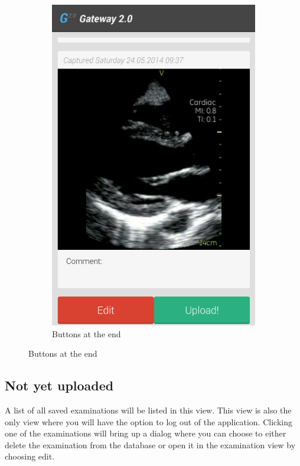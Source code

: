 \begin{figure}[H]
    \begin{subfigure}[b]{0.49\textwidth}
        \includegraphics[width=\textwidth]{img/interface/9-ReviewAndUploadEnd.png}
        \caption*{Buttons at the end}
        \label{fig:09reviewend}
    \end{subfigure}
\end{figure}

\newpage
\subsection*{Not yet uploaded}
A list of all saved examinations will be listed in this view. This view is also the only view where you will have the option to log out of the application. Clicking one of the examinations will bring up a dialog where you can choose to either delete the examination from the database or open it in the examination view by choosing edit.

